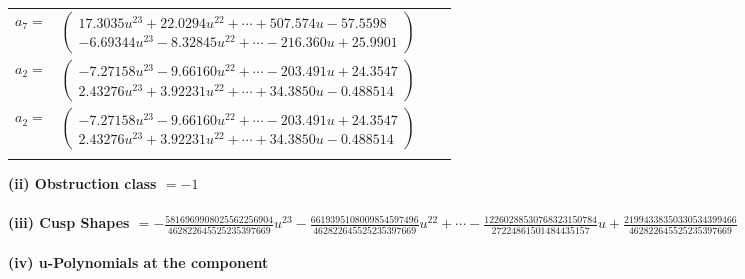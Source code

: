 \documentclass[1p]{elsarticle_modified}
\theoremstyle{definition}
\begin{document}
\begin{tabular}{m{7pt} m{180pt} m{7pt} m{180pt} }
\flushright $a_{7}=$&$\begin{pmatrix}17.3035 u^{23}+22.0294 u^{22}+\cdots+507.574 u-57.5598\\-6.69344 u^{23}-8.32845 u^{22}+\cdots-216.360 u+25.9901\end{pmatrix}$ \\
\flushright $a_{2}=$&$\begin{pmatrix}-7.27158 u^{23}-9.66160 u^{22}+\cdots-203.491 u+24.3547\\2.43276 u^{23}+3.92231 u^{22}+\cdots+34.3850 u-0.488514\end{pmatrix}$\\ \flushright $a_{2}=$&$\begin{pmatrix}-7.27158 u^{23}-9.66160 u^{22}+\cdots-203.491 u+24.3547\\2.43276 u^{23}+3.92231 u^{22}+\cdots+34.3850 u-0.488514\end{pmatrix}$\\&\end{tabular}
\flushleft \textbf{(ii) Obstruction class $= -1$}\\~\\
\flushleft \textbf{(iii) Cusp Shapes $= -\frac{5816969908025562256904}{462822645525235397669} u^{23}-\frac{6619395108009854597496}{462822645525235397669} u^{22}+\cdots-\frac{12260288530768323150784}{27224861501484435157} u+\frac{21994338350330534399466}{462822645525235397669}$}\\~\\
\newpage\renewcommand{\arraystretch}{1}
\flushleft \textbf{(iv) u-Polynomials at the component}\newline \\
\end{document}
